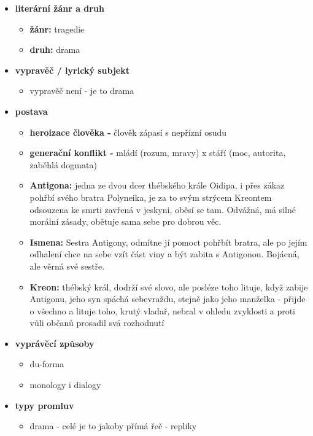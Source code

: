 \documentclass[11pt]{article}
\begin{document}
\begin{itemize}
        \item\textbf{literární žánr a druh}
        \begin{itemize}
            \item \textbf{žánr:} tragedie
            \item \textbf{druh:} drama
        \end{itemize}
        \item\textbf{vypravěč / lyrický subjekt}
        \begin{itemize}
            \item vypravěč není - je to drama
        \end{itemize}
        \item\textbf{postava}
        \begin{itemize}
            \item \textbf{heroizace člověka - }člověk zápasí s nepřízní osudu
            \item \textbf{generační konflikt - }mládí (rozum, mravy) x stáří (moc, autorita, zaběhlá dogmata)
            \item \textbf{Antigona:} jedna ze dvou dcer thébského krále Oidipa, i přes zákaz pohřbí svého bratra Polyneika, je za to svým strýcem Kreontem odsouzena ke smrti zavřená v jeskyni, oběsí se tam. Odvážná, má silné morální zásady, obětuje sama sebe pro dobrou věc.
            \item \textbf{Ismena:} Sestra Antigony, odmítne jí pomoct pohřbít bratra, ale po jejím odhalení chce na sebe vzít část viny a být zabita s Antigonou. Bojácná, ale věrná své sestře.
            \item \textbf{Kreon:} thébský král, dodrží své slovo, ale posléze toho lituje, když zabije Antigonu, jeho syn spáchá sebevraždu, stejně jako jeho manželka - přijde o všechno a lituje toho, krutý vladař, nebral v ohledu zvyklosti a proti vůli občanů prosadil svá rozhodnutí
        \end{itemize}
        \item\textbf{vyprávěcí způsoby}
        \begin{itemize}
            \item du-forma
            \item monology i dialogy
        \end{itemize}
        \item\textbf{typy promluv}
        \begin{itemize}
            \item drama - celé je to jakoby přímá řeč - repliky

\end{itemize}
\end{itemize}
\end{document}
